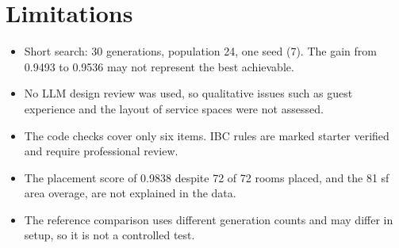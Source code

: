 \documentclass[10pt]{article}
\begin{document}
\section{Limitations}
\begin{itemize}
\item Short search: 30 generations, population 24, one seed (7). The gain from 0.9493 to 0.9536 may not represent the best achievable.
\item No LLM design review was used, so qualitative issues such as guest experience and the layout of service spaces were not assessed.
\item The code checks cover only six items. IBC rules are marked starter verified and require professional review.
\item The placement score of 0.9838 despite 72 of 72 rooms placed, and the 81 sf area overage, are not explained in the data.
\item The reference comparison uses different generation counts and may differ in setup, so it is not a controlled test.
\end{itemize}
\end{document}
